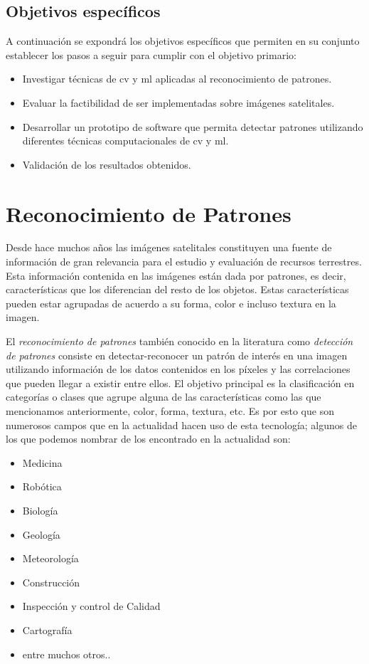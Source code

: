 \subsection{Objetivos específicos }\label{sub:ObjEspecif}
A continuación se expondrá los objetivos específicos que permiten en su conjunto establecer los pasos a seguir para  cumplir con el objetivo primario:
\begin{itemize}
 \item Investigar técnicas de \ac{cv} y \ac{ml} aplicadas al reconocimiento de patrones.
 \item Evaluar la factibilidad de ser implementadas sobre imágenes satelitales.
 \item Desarrollar un prototipo de software que permita detectar patrones utilizando diferentes técnicas computacionales de \ac{cv} y \ac{ml}.
 \item Validación de los resultados obtenidos.
\end{itemize}









\section{Reconocimiento de Patrones}\label{sec:introreconocimiento}
Desde hace muchos años las imágenes satelitales constituyen una fuente de información de gran relevancia para el estudio y evaluación de recursos terrestres. Esta  información contenida en las imágenes están dada por patrones, es decir, características que los diferencian del resto de los objetos. Estas características pueden estar agrupadas  de acuerdo a su forma, color e incluso textura en la imagen.

El \textit{reconocimiento de patrones} también conocido en la literatura como \textit{detección de patrones} consiste en detectar-reconocer un patrón de interés en una imagen utilizando información de los datos contenidos en los píxeles y las correlaciones que pueden llegar a existir entre ellos. El objetivo principal es la clasificación  en categorías o clases que agrupe alguna de las características como las que mencionamos anteriormente, color, forma, textura, etc. Es por esto que son numerosos campos que en la actualidad hacen uso de esta tecnología; algunos de los que podemos nombrar de los encontrado en la actualidad son:

\begin{itemize}
	\item Medicina
	\item Robótica
	\item Biología
	\item Geología 
	\item Meteorología
	\item Construcción 
	\item Inspección y control de Calidad
	\item Cartografía
	\item entre muchos otros..
\end{itemize}

